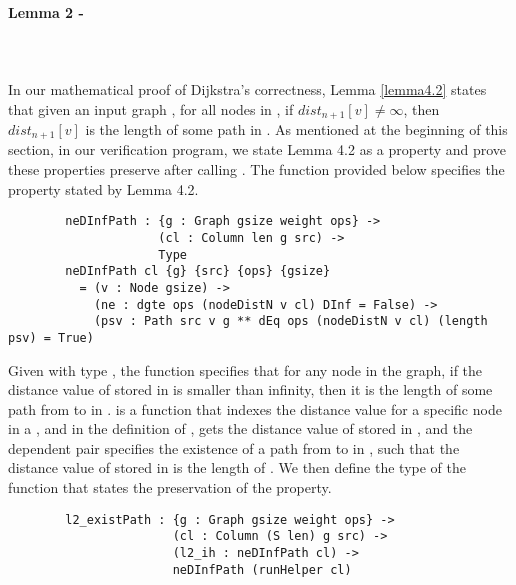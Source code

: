 \paragraph{Lemma 2 - }
\tab\\\\
In our mathematical proof of Dijkstra's correctness, Lemma \ref{lemma4.2} states that given an input graph , for all nodes  in , if $dist_{n+1}[v] \neq \infty$, then $dist_{n+1}[v]$ is the length of some  path in . As mentioned at the beginning of this section, in our verification program, we state Lemma 4.2 as a  property and prove these properties preserve after calling . The function  provided below specifies the  property stated by Lemma 4.2.
\begin{lstlisting}
		neDInfPath : {g : Graph gsize weight ops} ->
		             (cl : Column len g src) ->
		             Type
		neDInfPath cl {g} {src} {ops} {gsize}
		  = (v : Node gsize) ->
		    (ne : dgte ops (nodeDistN v cl) DInf = False) ->
		    (psv : Path src v g ** dEq ops (nodeDistN v cl) (length psv) = True)
\end{lstlisting}
 
Given  with type , the function  specifies that for any node  in the graph, if the distance value of  stored in  is smaller than infinity, then it is the length of some path from  to  in .  is a function that indexes the distance value for a specific node in a , and in the definition of ,  gets the distance value of  stored in , and the dependent pair  specifies the existence of a path  from  to  in , such that the distance value of  stored in  is the length of . We then define the type of the function  that states the preservation of the  property. 
\begin{lstlisting}
		l2_existPath : {g : Graph gsize weight ops} ->
		               (cl : Column (S len) g src) ->
		               (l2_ih : neDInfPath cl) ->
		               neDInfPath (runHelper cl)
\end{lstlisting}


